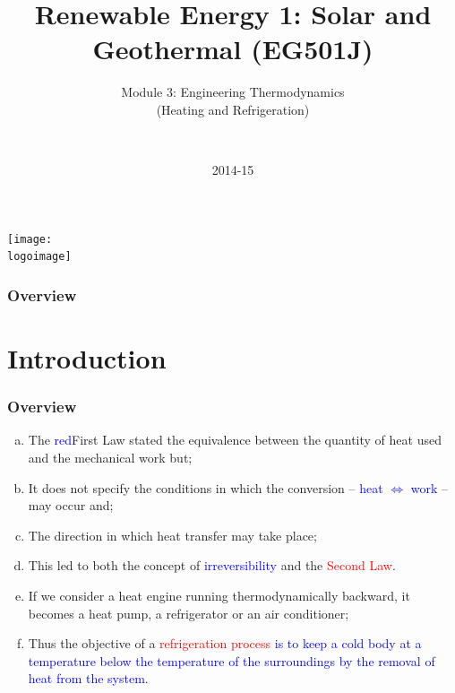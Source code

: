 \documentclass[10pt,compress,handout,ignorenonframetext]{beamer}
\institute{School of Engineering}
\title{Renewable Energy 1: Solar and Geothermal (EG501J)}
\subtitle{Module 3: Engineering Thermodynamics \\ (Heating and Refrigeration)}
\date[2014-15]{2014-15}
\author[\shortname]{%
  \fullname\\\ttfamily{\emailaddress}
}
\newcommand{\logoimage}{../FigBanner/UoAHorizBanner}
\begin{document}
\begin{frame}
  \titlepage
  \vfill%
  \begin{center}
    \texttt{[image: \\logoimage]}
  \end{center}
\end{frame}


\begin{frame}
\frametitle{Overview} %
\tableofcontents %
\end{frame}





\section{Introduction}

\begin{frame}
 \frametitle{Overview}
  \begin{enumerate}[(a)]
   \item <1-> The \textcolor{blue}{red}{First Law} stated the equivalence between the quantity of heat used and the mechanical work but;
   \item <2-> It does not specify the conditions in which the conversion -- \textcolor{blue}{heat $\Leftrightarrow$ work} -- may occur and;
   \item <3-> The direction in which heat transfer may take place;
   \item <4-> This led to both the concept of \textcolor{blue}{irreversibility} and the \textcolor{red}{Second Law}.
   \item <5-> If we consider a heat engine running thermodynamically backward, it becomes a heat pump, a refrigerator or an air conditioner;
   \item <6-> Thus the objective of a \textcolor{red}{refrigeration process} \textcolor{blue}{is to keep a cold body at a temperature below the temperature of the surroundings by the removal of heat from the system}.
  \end{enumerate}
\end{frame}
\end{document}
